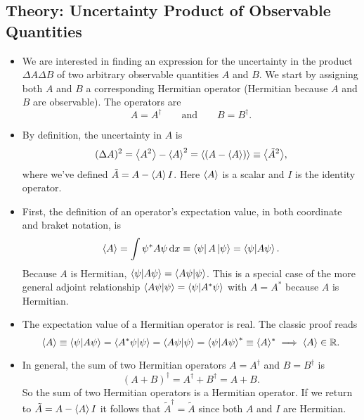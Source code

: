 \documentclass[11pt, a4paper]{article}
\newcommand{\diff}{\mathop{}\!\mathrm{d}} %
\newcommand{\eqtext}[1]{\qquad \text{#1} \qquad}
\begin{document}
\subsection{Theory: Uncertainty Product of Observable Quantities}
\begin{itemize}
	\item We are interested in finding an expression for the uncertainty in the product $ \Delta A \Delta B $ of two arbitrary observable quantities $ A $ and $ B $. We start by assigning both $ A $ and $ B $ a corresponding Hermitian operator (Hermitian because $ A $ and $ B $ are observable). The operators are
	\begin{equation*}
		A = A^{\dagger} \eqtext{and} B = B^{\dagger}.
	\end{equation*}
	
	\item By definition, the uncertainty in $ A $ is
	\begin{equation*}
		(\Delta A)^{2} = \expval{A^{2}} - \expval{A}^{2} = \expval{(A - \expval{A})} \equiv \big\langle \tilde{A}^{2} \big\rangle,
	\end{equation*}
	where we've defined $ \tilde{A} = A - \expval{A}I $. Here $ \expval{A} $ is a scalar and $ I $ is the identity operator. 
	
	\item First, the definition of an operator's expectation value, in both coordinate and braket notation, is
	\begin{equation*}
		\ev{A} = \int \psi^{*} A \psi \diff x \equiv \bra{\psi}A\ket{\psi} = \braket{\psi}{A\psi}.
	\end{equation*}
	Because $ A $ is Hermitian, $ \braket{\psi}{A\psi} = \braket{A\psi}{\psi} $. This is a special case of the more general adjoint relationship $ \braket{A\psi}{\psi} = \braket{\psi}{A^{*}\psi} $ with $ A = A^{*} $ because $ A $ is Hermitian. 
	
	\item The expectation value of a Hermitian operator is real. The classic proof reads
	\begin{equation*}
		\ev{A} \equiv \braket{\psi}{A\psi} = \braket{A^{*}\psi}{\psi} = \braket{A\psi}{\psi} = \braket{\psi}{A\psi}^{*} \equiv \langle A \rangle^{*} \implies \langle A \rangle \in \mathbb{R}.
	\end{equation*}
	
	\item In general, the sum of two Hermitian operators $ A = A^{\dagger} $ and $ B = B^{\dagger} $ is
	\begin{equation*}
		(A + B)^{\dagger} = A^{\dagger} + B^{\dagger} = A + B.
	\end{equation*}
	So the sum of two Hermitian operators is a Hermitian operator. If we return to $ \tilde{A} = A - \expval{A}I  $ it follows that $ \tilde{A}^{\dagger} = \tilde{A} $ since both $ A $ and $ I $ are Hermitian.
	

\end{itemize}
\end{document}
